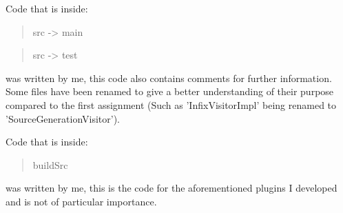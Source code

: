 \documentclass[a4paper,12pt]{article}
\begin{document}
Code that is inside:
\begin{quotation}
src -> main
\end{quotation}
\begin{quotation}
src -> test
\end{quotation}
was written by me, this code also contains comments for further information. Some files have been renamed to give a better understanding of their purpose compared to the first assignment (Such as 'InfixVisitorImpl' being renamed to 'SourceGenerationVisitor').

Code that is inside:
\begin{quotation}
buildSrc
\end{quotation}
was written by me, this is the code for the aforementioned plugins I developed and is not of particular importance.
\end{document}
